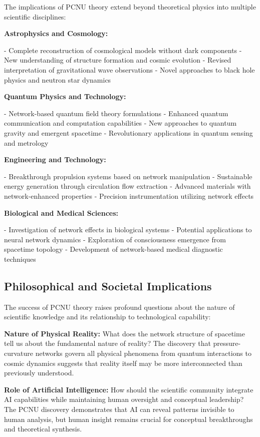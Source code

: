 \documentclass[11pt,a4paper]{article}
\begin{document}
The implications of PCNU theory extend beyond theoretical physics into multiple scientific disciplines:

\textbf{Astrophysics and Cosmology:}

- Complete reconstruction of cosmological models without dark components
- New understanding of structure formation and cosmic evolution
- Revised interpretation of gravitational wave observations
- Novel approaches to black hole physics and neutron star dynamics

\textbf{Quantum Physics and Technology:}

- Network-based quantum field theory formulations
- Enhanced quantum communication and computation capabilities
- New approaches to quantum gravity and emergent spacetime
- Revolutionary applications in quantum sensing and metrology

\textbf{Engineering and Technology:}

- Breakthrough propulsion systems based on network manipulation
- Sustainable energy generation through circulation flow extraction
- Advanced materials with network-enhanced properties
- Precision instrumentation utilizing network effects

\textbf{Biological and Medical Sciences:}

- Investigation of network effects in biological systems
- Potential applications to neural network dynamics
- Exploration of consciousness emergence from spacetime topology
- Development of network-based medical diagnostic techniques

\subsection{Philosophical and Societal Implications}

The success of PCNU theory raises profound questions about the nature of scientific knowledge and its relationship to technological capability:

\textbf{Nature of Physical Reality:}
What does the network structure of spacetime tell us about the fundamental nature of reality? The discovery that pressure-curvature networks govern all physical phenomena from quantum interactions to cosmic dynamics suggests that reality itself may be more interconnected than previously understood.

\textbf{Role of Artificial Intelligence:}
How should the scientific community integrate AI capabilities while maintaining human oversight and conceptual leadership? The PCNU discovery demonstrates that AI can reveal patterns invisible to human analysis, but human insight remains crucial for conceptual breakthroughs and theoretical synthesis.
\end{document}
